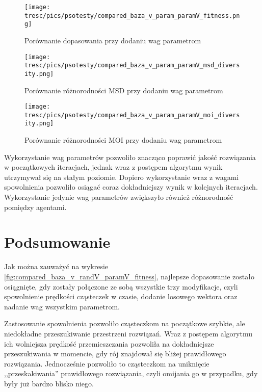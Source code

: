 \clearpage

\begin{figure}[H]
\begin{center} 
\texttt{[image: tresc/pics/psotesty/compared\_baza\_v\_param\_paramV\_fitness.png]}
\caption{Porównanie dopasowania przy dodaniu wag parametrom}
\label{fig:compared_baza_v_param_paramV_fitness}
\end{center}
\end{figure}

\begin{figure}[H]
\begin{center} 
\texttt{[image: tresc/pics/psotesty/compared\_baza\_v\_param\_paramV\_msd\_diversity.png]}
\caption{Porównanie różnorodności MSD przy dodaniu wag parametrom}
\label{fig:compared_baza_v_param_paramV_msd_diversity}
\end{center}
\end{figure}

\begin{figure}[H]
\begin{center} 
\texttt{[image: tresc/pics/psotesty/compared\_baza\_v\_param\_paramV\_moi\_diversity.png]}
\caption{Porównanie różnorodności MOI przy dodaniu wag parametrom}
\label{fig:compared_baza_v_param_paramV_moi_diversity}
\end{center}
\end{figure}

Wykorzystanie wag parametrów pozwoliło znacząco poprawić jakość rozwiązania w początkowych iteracjach, jednak wraz z postępem algorytmu wynik utrzymywał się na stałym poziomie. Dopiero wykorzystanie wraz z wagami spowolnienia pozwoliło osiągać coraz dokładniejszy wynik w kolejnych iteracjach. Wykorzystanie jedynie wag parametrów zwiększyło również różnorodność pomiędzy agentami.

\section{Podsumowanie}
Jak można zauważyć na wykresie \ref{fig:compared_baza_v_randV_paramV_fitness}, najlepsze dopasowanie zostało osiągnięte, gdy zostały połączone ze sobą wszystkie trzy modyfikacje, czyli spowolnienie prędkości cząsteczek w czasie, dodanie losowego wektora oraz nadanie wag wszystkim parametrom. 

Zastosowanie spowolnienia pozwoliło cząsteczkom na początkowe szybkie, ale niedokładne przeszukiwanie przestrzeni rozwiązań. Wraz z postępem algorytmu ich wolniejsza prędkość przemieszczania pozwoliła na dokładniejsze przeszukiwania w momencie, gdy rój znajdował się bliżej prawidłowego rozwiązania. Jednocześnie pozwoliło to cząsteczkom na uniknięcie ,,przeskakiwania'' prawidłowego rozwiązania, czyli omijania go w przypadku, gdy były już bardzo blisko niego.

